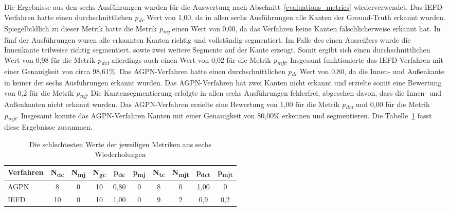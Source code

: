 Die Ergebnisse aus den sechs Ausführungen wurden für die Auswertung nach Abschnitt~\ref{evaluations_metrics} wiederverwendet. Das IEFD-Verfahren hatte einen durchschnittlichen \textit{p\textsubscript{dc}} Wert von 1,00, da in allen sechs Ausführungen alle Kanten der Ground-Truth erkannt wurden. Spiegelbildlich zu dieser Metrik hatte die Metrik \textit{p\textsubscript{mj}} einen Wert von 0,00, da das Verfahren keine Kanten fälschlicherweise erkannt hat. In fünf der Ausführungen wuren alle erkannten Kanten richtig und vollständig segmentiert. Im Falle des einen Ausreißers wurde die Innenkante teilweise richtig segmentiert, sowie zwei weitere Segmente auf der Kante erzeugt. Somit ergibt sich einen durchschnittlichen Wert von 0,98 für die Metrik \textit{p\textsubscript{dct}} allerdings auch einen Wert von 0,02 für die Metrik \textit{p\textsubscript{mjt}}. Insgesamt funktionierte das IEFD-Verfahren mit einer Genauigkeit von circa 98,61\%. Das AGPN-Verfahren hatte einen durchschnittlichen \textit{p\textsubscript{dc}} Wert von 0,80, da die Innen- und Außenkante in keiner der sechs Ausführungen erkannt wurden. Das AGPN-Verfahren hat zwei Kanten nicht erkannt und erzielte somit eine Bewertung von 0,2 für die Metrik \textit{p\textsubscript{mj}}. Die Kantensegmentierung erfolgte in allen sechs Ausführungen fehlerfrei, abgesehen davon, dass die Innen- und Außenkanten nicht erkannt wurden. Das AGPN-Verfahren erzielte eine Bewertung von 1,00 für die Metrik \textit{p\textsubscript{dct}} und 0,00 für die Metrik \textit{p\textsubscript{mjt}}. Insgesamt konnte das AGPN-Verfahren Kanten mit einer Genauigkeit von 80,00\% erkennen und segmentieren. Die Tabelle~\ref{table: metric_values} fasst diese Ergebnisse zusammen.

\begin{table}[h]
	\centering
	\begin{tabular}{l *{9}{c}}
		\hline
		\textbf{Verfahren} & \textbf{N\textsubscript{dc}} & \textbf{N\textsubscript{mj}} & \textbf{N\textsubscript{gc}} & \textbf{p\textsubscript{dc}} & \textbf{p\textsubscript{mj}} & \textbf{N\textsubscript{tc}} & \textbf{N\textsubscript{mjt}} & \textbf{p\textsubscript{dct}} & \textbf{p\textsubscript{mjt}} \\
		\hline
		AGPN & 8 & 0 & 10 & 0,80 & 0 & 8 & 0 & 1,00 & 0 \\
		IEFD & 10 & 0 & 10 & 1,00 & 0 & 9 & 2 & 0,9 & 0,2 \\
		\hline
	\end{tabular}
	\caption[Ergebnisse der ersten Untersuchung]{Die schlechtesten Werte der jeweiligen Metriken aus sechs Wiederholungen}
	\label{table: metric_values}
\end{table}

